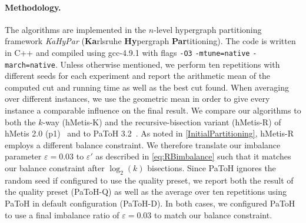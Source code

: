 \documentclass[runningheads,a4paper]{llncs}
\begin{document}
\paragraph{Methodology.}  \label{Methodology}
The algorithms are implemented in the $n$-level hypergraph partitioning framework \emph{KaHyPar} (\textbf{Ka}rlsruhe \textbf{Hy}pergraph \textbf{Par}titioning). The code is written in C++ and compiled using gcc-4.9.1 with flags \texttt{-O3} \texttt{-mtune=native} \texttt{-march=native}. 
Unless otherwise mentioned, we perform ten repetitions with different seeds for each experiment and report the arithmetic 
mean of the computed cut and running time as well as the best cut found. When averaging over different instances, we use the 
geometric mean in order to give every instance a comparable influence on the final result. 
We compare our algorithms to both the $k$-way (hMetis-K) and the recursive-bisection variant (hMetis-R) of hMetis 2.0 (p1)~\cite{hMetisRB,hMetisKway} and to PaToH 3.2~\cite{PaToH}. 
As noted in \autoref{InitialPartitioning}, hMetis-R employs a different balance constraint. We therefore translate our
imbalance parameter $\varepsilon=0.03$ to $\varepsilon'$ as described in \autoref{eq:RBimbalance} such that it matches our balance constraint after $\log_2(k)$ 
bisections.  
Since PaToH ignores the random seed if configured to use the quality preset, we report both the result of the quality preset (PaToH-Q) as well as the
average over ten repetitions using PaToH in default configuration (PaToH-D). In both cases, we configured PaToH to use a final imbalance ratio of $\varepsilon = 0.03$ to
match our balance constraint.
\end{document}
